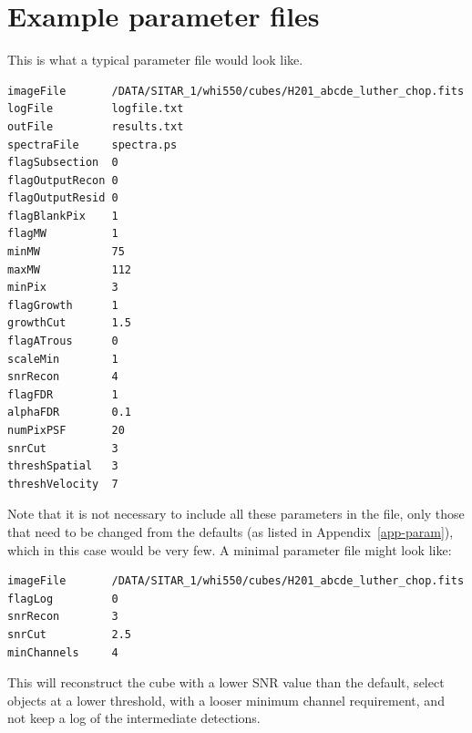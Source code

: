 \documentclass[12pt,a4paper]{article}
\begin{document}
\newpage
\section{Example parameter files}
\label{app-input}

This is what a typical parameter file would look like.

\begin{verbatim}
imageFile       /DATA/SITAR_1/whi550/cubes/H201_abcde_luther_chop.fits
logFile         logfile.txt
outFile         results.txt
spectraFile     spectra.ps
flagSubsection  0
flagOutputRecon 0
flagOutputResid 0
flagBlankPix    1
flagMW          1
minMW           75
maxMW           112
minPix          3
flagGrowth      1
growthCut       1.5
flagATrous      0
scaleMin        1
snrRecon        4
flagFDR         1
alphaFDR        0.1
numPixPSF       20
snrCut          3
threshSpatial   3
threshVelocity  7
\end{verbatim}

Note that it is not necessary to include all these parameters in the
file, only those that need to be changed from the defaults (as listed
in Appendix~\ref{app-param}), which in this case would be very few. A
minimal parameter file might look like:
\begin{verbatim}
imageFile       /DATA/SITAR_1/whi550/cubes/H201_abcde_luther_chop.fits
flagLog         0
snrRecon        3
snrCut          2.5
minChannels     4
\end{verbatim}
This will reconstruct the cube with a lower SNR value than the
default, select objects at a lower threshold,  with a looser minimum
channel requirement, and not keep a log of the intermediate
detections. 
\end{document}
